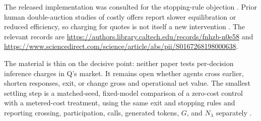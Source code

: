 \documentclass{article}
\begin{document}
The released implementation was consulted for the stopping-rule objection . Prior human double-auction studies of costly offers report slower equilibration or reduced efficiency, so charging for quotes is not itself a new intervention . The relevant records are \url{https://authors.library.caltech.edu/records/fnhzb-n0e58} and \url{https://www.sciencedirect.com/science/article/abs/pii/S0167268198000638}.

The material is thin on the decisive point: neither paper tests per-decision inference charges in Q's market. It remains open whether agents cross earlier, shorten responses, exit, or change gross and operational net value. The smallest settling step is a matched-seed, fixed-model comparison of a zero-cost control with a metered-cost treatment, using the same exit and stopping rules and reporting crossing, participation, calls, generated tokens, \(G\), and \(N_{\lambda}\) separately .
\end{document}
